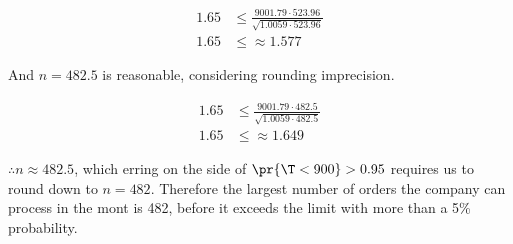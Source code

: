 \begin{align*}
1.65 &\leq \frac{900  1.79 \cdot 523.96}{\sqrt{1.0059\cdot523.96}} \\
1.65 &\leq \approx 1.577
\end{align*}

And $n = 482.5$ is reasonable, considering rounding imprecision.

\begin{align*}
1.65 &\leq \frac{900  1.79 \cdot 482.5}{\sqrt{1.0059\cdot482.5}} \\
1.65 &\leq \approx 1.649
\end{align*}

$\therefore n \approx 482.5$, which erring on the side of $\pr{\T < 900} > 0.95$ requires
us to round down to $n = 482$.
Therefore the largest number of orders the company can process in the mont is 482,
before it exceeds the limit with more than a 5\% probability.
